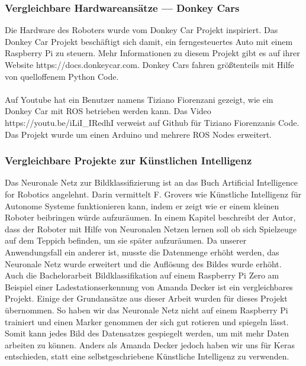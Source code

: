 \documentclass[conference]{IEEEtran}
\begin{document}
\subsubsection{Vergleichbare Hardwareansätze — Donkey Cars} %
Die Hardware des Roboters wurde vom Donkey Car Projekt inspiriert.
Das Donkey Car Projekt beschäftigt sich damit, ein ferngesteuertes Auto mit einem Raspberry Pi zu steuern.
Mehr Informationen zu diesem Projekt gibt es auf ihrer Website https://docs.donkeycar.com.
Donkey Cars fahren größtenteils mit Hilfe von quelloffenem Python Code. \\
\\
Auf Youtube hat ein Benutzer namens Tiziano Fiorenzani gezeigt, wie ein Donkey Car mit ROS betrieben werden kann.
Das Video https://youtu.be/iLiI\_IRedhI verweist auf Github für Tiziano Fiorenzanis Code.
Das Projekt wurde um einen Arduino und mehrere ROS Nodes erweitert.

\subsubsection{Vergleichbare Projekte zur Künstlichen Intelligenz} %
Das Neuronale Netz zur Bildklassifizierung ist an das Buch \glqq Artificial Intelligence for Robotics\grqq  \cite{b1} angelehnt.
Darin vermittelt F. Grovers wie Künstliche Intelligenz für Autonome Systeme funktionieren kann, indem er zeigt wie er einem kleinen Roboter beibringen würde aufzuräumen.
In einem Kapitel beschreibt der Autor, dass der Roboter mit Hilfe von Neuronalen Netzen lernen soll ob sich Spielzeuge auf dem Teppich befinden, um sie später aufzuräumen.
Da unserer Anwendungsfall ein anderer ist, musste die Datenmenge erhöht werden, das Neuronale Netz wurde erweitert und die Auflösung des Bildes wurde erhöht.
\\

Auch die Bachelorarbeit \glqq Bildklassifikation auf einem Raspberry Pi Zero am Beispiel einer Ladestationserkennung\grqq \cite{b2} von Amanda Decker ist ein vergleichbares Projekt.
Einige der Grundansätze aus dieser Arbeit wurden für dieses Projekt übernommen.
So haben wir das Neuronale Netz nicht auf einem Raspberry Pi trainiert und einen Marker genommen der sich gut rotieren und spiegeln lässt.
Somit kann jedes Bild des Datensatzes gespiegelt werden, um mit mehr Daten arbeiten zu können.
Anders als Amanda Decker jedoch haben wir uns für Keras entschieden, statt eine selbstgeschriebene Künstliche Intelligenz zu verwenden.
\end{document}
